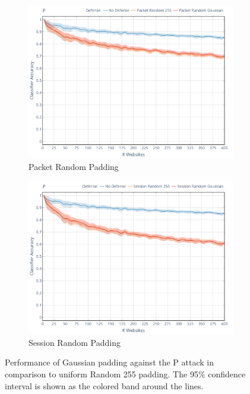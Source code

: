 \documentclass[
	ruledheaders=chapter,
	class=report,
	thesis={type=master, department=inf},
	accentcolor=1c,
	custommargins=true,
	marginpar=false,
	parskip=half-,
	fontsize=11pt,
]{tudapub}
\begin{document}
	\begin{figure}
		\begin{subfigure}{0.495\textwidth}
			\centering
			\includegraphics[width=\textwidth]{plots/performance_p_pkt.png}
			\caption{Packet Random Padding}
		\end{subfigure}
       \hfill
		\begin{subfigure}{0.495\textwidth}
			\centering
			\includegraphics[width=\textwidth]{plots/performance_p_ses.png}
			\caption{Session Random Padding}
		\end{subfigure}
		\caption[Performance of Gaussian padding against the P attack]{Performance of Gaussian padding against the P attack \cite{Panchenko2011} in comparison to uniform Random 255 padding. The 95\% confidence interval is shown as the colored band around the lines.}
		\label{fig:p}
	\end{figure}
\end{document}
